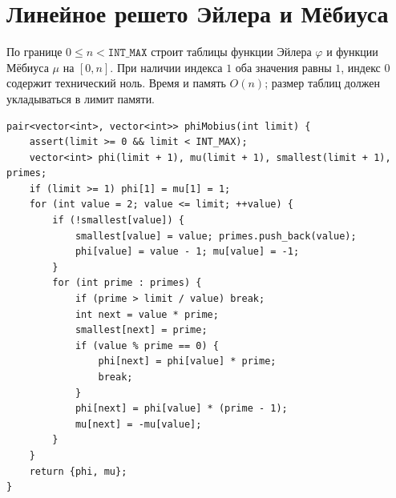 \section{Линейное решето Эйлера и Мёбиуса}
По границе $0\le n<\texttt{INT\_MAX}$ строит таблицы функции Эйлера $\varphi$ и функции Мёбиуса $\mu$ на $[0,n]$.
При наличии индекса $1$ оба значения равны $1$, индекс $0$ содержит технический ноль.
Время и память $O(n)$; размер таблиц должен укладываться в лимит памяти.
\begin{lstlisting}[name=extra_math_sieve]
pair<vector<int>, vector<int>> phiMobius(int limit) {
    assert(limit >= 0 && limit < INT_MAX);
    vector<int> phi(limit + 1), mu(limit + 1), smallest(limit + 1), primes;
    if (limit >= 1) phi[1] = mu[1] = 1;
    for (int value = 2; value <= limit; ++value) {
        if (!smallest[value]) {
            smallest[value] = value; primes.push_back(value);
            phi[value] = value - 1; mu[value] = -1;
        }
        for (int prime : primes) {
            if (prime > limit / value) break;
            int next = value * prime;
            smallest[next] = prime;
            if (value % prime == 0) {
                phi[next] = phi[value] * prime;
                break;
            }
            phi[next] = phi[value] * (prime - 1);
            mu[next] = -mu[value];
        }
    }
    return {phi, mu};
}
\end{lstlisting}
%

